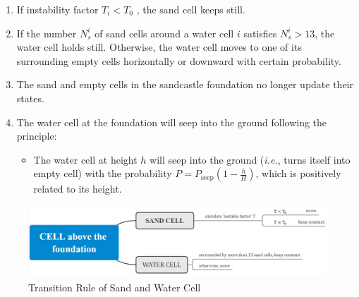 \documentclass{mcmthesis}		    %
\def\ie{\mbox{\textit{i.e.}}}
\begin{document}
\begin{enumerate}
\begin{itemize}
\end{itemize}
 
\item If instability factor $T_i<T_0$ , the sand cell keeps still. 

\item If the number $N_{s}^{i}$ of sand cells around a water cell $i$ satisfies $ N_{s}^{i}>13 $, the water cell holds still. Otherwise, the water cell moves to one of its surrounding empty cells horizontally or downward with certain probability.

\item The sand and empty cells in the sandcastle foundation no longer update their states.

\item The water cell at the foundation will seep into the ground following the principle: 

\begin{itemize}

    \item The water cell at height $h$ will seep into the ground (\ie, turns itself into empty cell) with the probability $P=P_\text{seep} (1-\frac{h}{H})$, which is positively related to its height. 

\end{itemize}
	\end{enumerate}
	\begin{figure}[htbp!]
	    \centering
	    \includegraphics[width=0.8\columnwidth]{Transition Rule of Sand and Water Cell.jpg}
	    \caption{Transition Rule of Sand and Water Cell}
	    \label{fig:Transition Rule of Sand and Water Cell}
	\end{figure}
	
\end{document}
